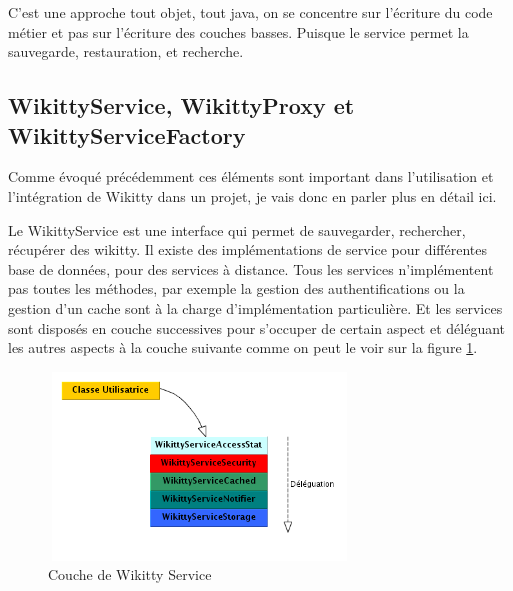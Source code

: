 C'est une approche tout objet, tout java, on se concentre sur l'écriture du code
métier et pas sur l'écriture des couches basses. Puisque le service permet la
sauvegarde, restauration, et recherche. 

% 
% 


\subsection{WikittyService, WikittyProxy et WikittyServiceFactory}

Comme évoqué précédemment ces éléments sont important dans l'utilisation et 
l'intégration de Wikitty dans un projet, je vais donc en parler plus en détail
ici.

Le WikittyService est une interface qui permet de sauvegarder, rechercher,
récupérer des wikitty. Il existe des implémentations de service pour différentes
base de données, pour des services à distance. Tous les services n'implémentent 
pas toutes les méthodes, par exemple la gestion des authentifications ou la 
gestion d'un cache sont à la charge d'implémentation particulière. Et les
services sont disposés en couche successives pour s'occuper de certain aspect
et déléguant les autres aspects à la couche suivante comme on peut le voir sur 
la figure \ref{pileService}.

\begin{figure}[!ht]
\centering
\includegraphics[height=5cm,width=8cm]{image/pileService.png}
  		\caption{Couche de Wikitty Service}
  		\label{pileService}
\end{figure}

